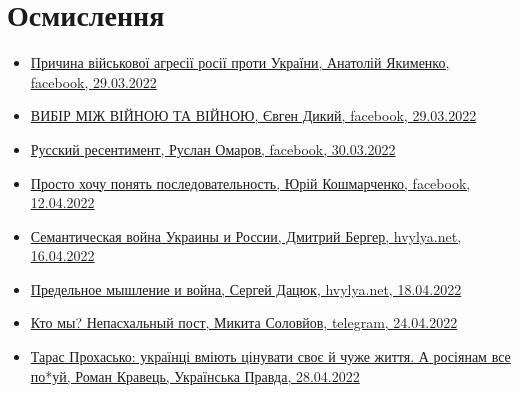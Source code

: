  
 
 
 
 
\section{Осмислення}
\label{sec:topics.vojna.osmyslenie}


\begin{itemize} %

\item \hyperlink{29_03_2022.fb.jakimenko_anatolij.1.prichina_agressii}{%
Причина військової агресії росії проти України, Анатолій Якименко, facebook, 29.03.2022%
}

\item \hyperlink{29_03_2022.fb.dykyj_evgen.1.vijna_vijna}{%
ВИБІР МІЖ ВІЙНОЮ ТА ВІЙНОЮ, Євген Дикий, facebook, 29.03.2022%
}

\item \hyperlink{30_03_2022.fb.omarov_ruslan.1.russkij_ressentiment}{%
Русский ресентимент, Руслан Омаров, facebook, 30.03.2022%
}

\item \hyperlink{12_04_2022.fb.koshmarchenko_jurij.1.posledovatelnost}{%
Просто хочу понять последовательность, Юрій Кошмарченко, facebook, 12.04.2022%
}

\item \hyperlink{16_04_2022.stz.news.ua.hvylya.1.semantic_war_ukrros}{%
Семантическая война Украины и России, Дмитрий Бергер, hvylya.net, 16.04.2022
}

\item \hyperlink{18_04_2022.stz.news.ua.hvylya.1.predelnoje_myshlenie_i_vojna}{%
Предельное мышление и война, Сергей Дацюк, hvylya.net, 18.04.2022%
}

\item \hyperlink{24_04_2022.tg.solovjov_mikita.harkov.demsokyra.1.kto_my_nepashalnyj_post}{%
Кто мы? Непасхальный пост, Микита Соловйов, telegram, 24.04.2022%
}

\item \hyperlink{28_04_2022.stz.news.ua.pravda.1.prohasjko_rossiane_pohuj}{%
Тарас Прохасько: українці вміють цінувати своє й чуже життя. А росіянам все по*уй, %
Роман Кравець, Українська Правда, 28.04.2022%
}



\end{itemize}
